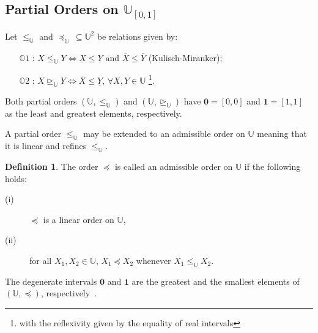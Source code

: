 \documentclass[12pt]{article}
\theoremstyle{plain}
\theoremstyle{remark}
\theoremstyle{definition}
\newtheorem{definition}[theorem]{Definition}
\theoremstyle{proposition}
\newcommand{\UU}{\mathbb{U} }
\begin{document}
\subsection{Partial Orders on $\UU_{[0,1]}$}

Let $\leq_{\mathbb{U}}$ and $\preceq_{\mathbb{U}} \, \subseteq \mathbb{U}^2$ be relations given by:
\begin{enumerate}
    \item[$\mathbb{O}1$]: $X\leq_{\mathbb{U}} Y \Leftrightarrow \underline{X} \leq \underline{Y} \mbox{ and }\overline{X} \leq \overline{Y}$  (Kulisch-Miranker);
    \item[$\mathbb{O}2$]:  $X \unrhd_{\mathbb{U}} Y  \Leftrightarrow \overline{X}\leq \underline{Y}$, $\forall X,Y \in \mathbb{U}$ \footnote{with the reflexivity given by the equality of real intervals }.
\end{enumerate}

Both partial orders $(\mathbb{U},\leq_{\mathbb{U}})$ and $(\mathbb{U},\unrhd_{\mathbb{U}})$ have  $\mathbf{0} = [0,0]$  and  $\mathbf{1}=[1,1]$ as the least and greatest elements, respectively. 



A partial order $\leq_{\mathbb{U}}$ may be extended  to an admissible order on $\mathbb{U}$ meaning that it is linear and refines $\leq_{\mathbb{U}}$.

\begin{definition}\cite{Bustince:2013}\label{def-linearorder}  The order $\preceq$ is called an admissible order on $\mathbb{U}$ if the following holds:
\begin{description}
\item [(i)] $\preceq$ is a linear order on $\mathbb{U}$,
\item [(ii)] for all $X_1, X_2 \in \mathbb{U}$, $X_1 \preceq X_2$ whenever $X_1 \leq_{\mathbb{U}} X_2$.
\end{description}
\end{definition}

The degenerate intervals  $\mathbf{0}$ and $\mathbf{1}$ are the greatest and the smallest elements of $(\mathbb{U}, \preceq)$, respectively~\cite{Bustince:2013}.
\end{document}
